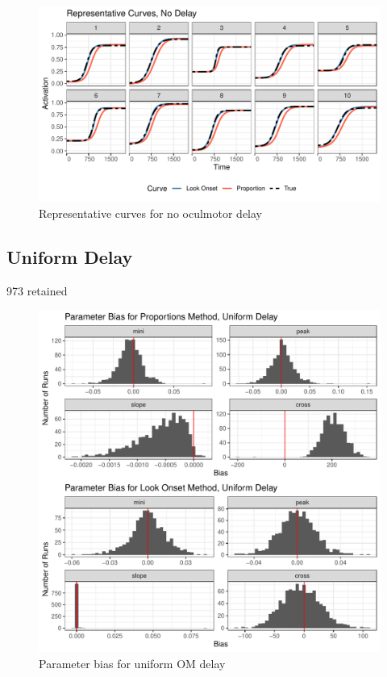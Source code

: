 \documentclass{article}
\begin{document}
\begin{figure}[H]
\centering
\includegraphics{rep_curves_no_delay.pdf}
\caption{Representative curves for no oculmotor delay}
\label{fig:rep_curves_no_delay}
\end{figure}

\subsection{Uniform Delay}

973 retained

\begin{figure}[H]
\centering
\includegraphics{uniform_delay_par_bias.pdf}
\caption{Parameter bias for uniform OM delay}
\label{fig:par_bias_uniform_delay}
\end{figure}
\end{document}
